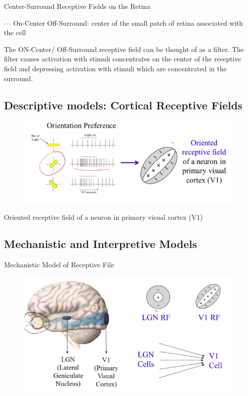 \documentclass{book}
\begin{document}
Center-Surround Receptive Fields on the Retina

--- On-Center Off-Surround: center of the small patch of retina associated with the cell

The ON-Center/ Off-Surround receptive field can be thought of as a filter. The filter causes activation with stimuli concentrates on the center of the receptive field and depressing activation with stimuli which are concentrated in the surround.

\subsection{Descriptive models: Cortical Receptive Fields}
\begin{figure}[h]
\centering
\includegraphics[width=0.7\linewidth]{figures/ReceptiveField_V1}
\caption{}
\label{fig:receptivefieldv1}
\end{figure}

Oriented receptive field of a neuron in primary visual cortex (V1)



\subsection{Mechanistic and Interpretive Models}

Mechanistic Model of Receptive File

\begin{figure}[h]
\centering
\includegraphics[width=0.7\linewidth]{figures/mechanistic_v1}
\caption{}
\label{fig:mechanisticv1}
\end{figure}
\end{document}
